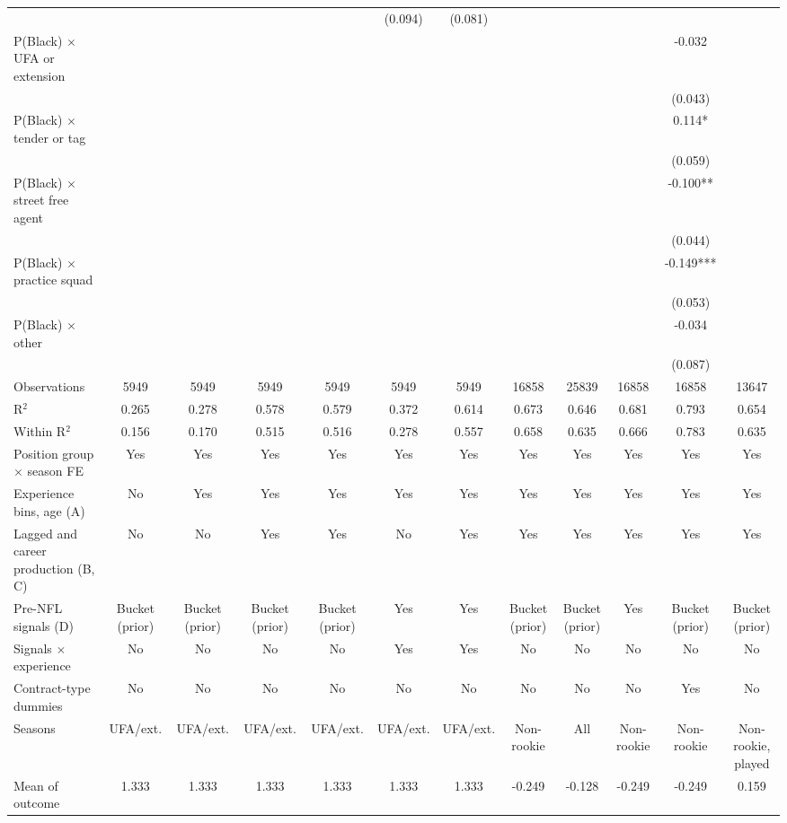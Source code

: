 \begin{table}[!h]
{\begin{threeparttable}
\begin{tabular}[t]{lccccccccccc}
 &  &  &  &  & (0.094) & (0.081) &  &  &  &  & \\
P(Black) $\times$ UFA or extension &  &  &  &  &  &  &  &  &  & -0.032 & \\
 &  &  &  &  &  &  &  &  &  & (0.043) & \\
P(Black) $\times$ tender or tag &  &  &  &  &  &  &  &  &  & 0.114* & \\
 &  &  &  &  &  &  &  &  &  & (0.059) & \\
P(Black) $\times$ street free agent &  &  &  &  &  &  &  &  &  & -0.100** & \\
 &  &  &  &  &  &  &  &  &  & (0.044) & \\
P(Black) $\times$ practice squad &  &  &  &  &  &  &  &  &  & -0.149*** & \\
 &  &  &  &  &  &  &  &  &  & (0.053) & \\
P(Black) $\times$ other &  &  &  &  &  &  &  &  &  & -0.034 & \\
 &  &  &  &  &  &  &  &  &  & (0.087) & \\
\midrule
Observations & 5949 & 5949 & 5949 & 5949 & 5949 & 5949 & 16858 & 25839 & 16858 & 16858 & 13647\\
R$^2$ & 0.265 & 0.278 & 0.578 & 0.579 & 0.372 & 0.614 & 0.673 & 0.646 & 0.681 & 0.793 & 0.654\\
Within R$^2$ & 0.156 & 0.170 & 0.515 & 0.516 & 0.278 & 0.557 & 0.658 & 0.635 & 0.666 & 0.783 & 0.635\\
Position group $\times$ season FE & Yes & Yes & Yes & Yes & Yes & Yes & Yes & Yes & Yes & Yes & Yes\\
Experience bins, age (A) & No & Yes & Yes & Yes & Yes & Yes & Yes & Yes & Yes & Yes & Yes\\
Lagged and career production (B, C) & No & No & Yes & Yes & No & Yes & Yes & Yes & Yes & Yes & Yes\\
Pre-NFL signals (D) & Bucket (prior) & Bucket (prior) & Bucket (prior) & Bucket (prior) & Yes & Yes & Bucket (prior) & Bucket (prior) & Yes & Bucket (prior) & Bucket (prior)\\
Signals $\times$ experience & No & No & No & No & Yes & Yes & No & No & No & No & No\\
Contract-type dummies & No & No & No & No & No & No & No & No & No & Yes & No\\
Seasons & UFA/ext. & UFA/ext. & UFA/ext. & UFA/ext. & UFA/ext. & UFA/ext. & Non-rookie & All & Non-rookie & Non-rookie & Non-rookie, played\\
Mean of outcome & 1.333 & 1.333 & 1.333 & 1.333 & 1.333 & 1.333 & -0.249 & -0.128 & -0.249 & -0.249 & 0.159\\

\end{tabular}
\end{threeparttable}}
\end{table}

